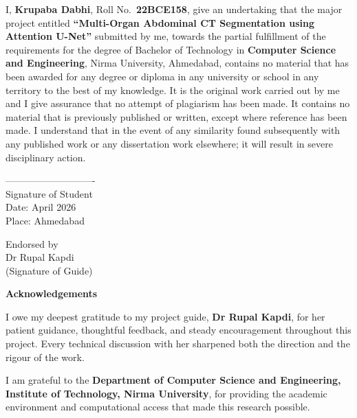 \noindent I, \textbf{Krupaba Dabhi}, Roll No.\ \textbf{22BCE158}, give an undertaking that the
major project entitled \textbf{``Multi-Organ Abdominal CT Segmentation using Attention U-Net''}
submitted by me, towards the partial fulfillment of the requirements for the degree of Bachelor of
Technology in \textbf{Computer Science and Engineering}, Nirma University, Ahmedabad, contains no
material that has been awarded for any degree or diploma in any university or school in any territory
to the best of my knowledge. It is the original work carried out by me and I give assurance that no
attempt of plagiarism has been made. It contains no material that is previously published or written,
except where reference has been made. I understand that in the event of any similarity found
subsequently with any published work or any dissertation work elsewhere; it will result in severe
disciplinary action.

\vspace{2cm}
\noindent ----------------------------\\
Signature of Student\\
Date: April 2026\\
Place: Ahmedabad\\

\begin{flushright}
Endorsed by \\
Dr Rupal Kapdi \\
(Signature of Guide)
\end{flushright}

\newpage
{}
\begin{center}
{\Large \bf Acknowledgements}\\
\end{center}
\vspace{10pt}

\noindent
I owe my deepest gratitude to my project guide, \textbf{Dr Rupal Kapdi}, for her patient guidance,
thoughtful feedback, and steady encouragement throughout this project. Every technical discussion
with her sharpened both the direction and the rigour of the work.

\noindent
I am grateful to the \textbf{Department of Computer Science and Engineering, Institute of
Technology, Nirma University}, for providing the academic environment and computational access that
made this research possible.

